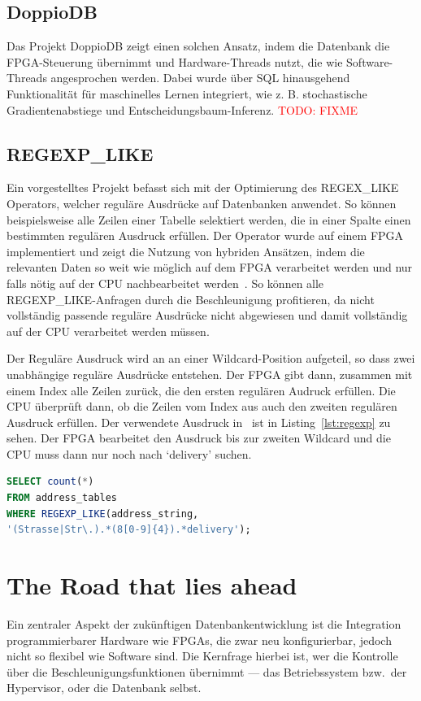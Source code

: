 \documentclass[conference]{IEEEtran}
\newcommand{\todo}[1]{\textcolor{red}{TODO: #1}}
\begin{document}
\subsection{DoppioDB}
Das Projekt DoppioDB zeigt einen solchen Ansatz, indem die Datenbank die FPGA-Steuerung
übernimmt und Hardware-Threads nutzt, die wie Software-Threads angesprochen werden. Dabei wurde über SQL hinausgehend Funktionalität für maschinelles Lernen integriert, wie z. B.
stochastische Gradientenabstiege und Entscheidungsbaum-Inferenz.
\todo{FIXME}

\subsection{REGEXP\_LIKE}
Ein vorgestelltes Projekt befasst sich mit der Optimierung des REGEX\_LIKE Operators, welcher reguläre Ausdrücke auf Datenbanken anwendet. So können beispielsweise
alle Zeilen einer Tabelle selektiert werden, die in einer Spalte einen bestimmten regulären Ausdruck erfüllen. Der Operator wurde auf einem FPGA implementiert
und zeigt die Nutzung von hybriden Ansätzen, indem die relevanten Daten so weit wie möglich auf dem FPGA verarbeitet werden und nur falls nötig auf der CPU
nachbearbeitet werden~\cite{sidler_accelerating_2017}. So können alle REGEXP\_LIKE-Anfragen durch die Beschleunigung profitieren, da nicht vollständig passende
reguläre Ausdrücke nicht abgewiesen und damit vollständig auf der CPU verarbeitet werden müssen.

Der Reguläre Ausdruck wird an an einer Wildcard-Position aufgeteil, so dass zwei unabhängige reguläre Ausdrücke entstehen. Der FPGA gibt dann, zusammen mit einem Index
alle Zeilen zurück, die den ersten regulären Audruck erfüllen. Die CPU überprüft dann, ob die Zeilen vom Index aus auch den zweiten regulären Ausdruck erfüllen.
Der verwendete Ausdruck in~\cite{sidler_accelerating_2017} ist in Listing~\ref{lst:regexp} zu sehen. Der FPGA bearbeitet den Ausdruck bis zur zweiten
Wildcard und die CPU muss dann nur noch nach `delivery' suchen.


\begin{lstlisting}[language=SQL,frame=single,caption={Regulärer Ausdruck aus \cite{sidler_accelerating_2017}},label={lst:regexp}]
SELECT count(*) 
FROM address_tables
WHERE REGEXP_LIKE(address_string,
'(Strasse|Str\.).*(8[0-9]{4}).*delivery');
\end{lstlisting}

\section{The Road that lies ahead}
Ein zentraler Aspekt der zukünftigen Datenbankentwicklung ist die Integration programmierbarer Hardware wie FPGAs, die zwar neu konfigurierbar, jedoch nicht so flexibel wie Software sind.
Die Kernfrage hierbei ist, wer die Kontrolle über die Beschleunigungsfunktionen übernimmt --- das Betriebssystem bzw.\ der Hypervisor, oder die Datenbank selbst.
\end{document}
